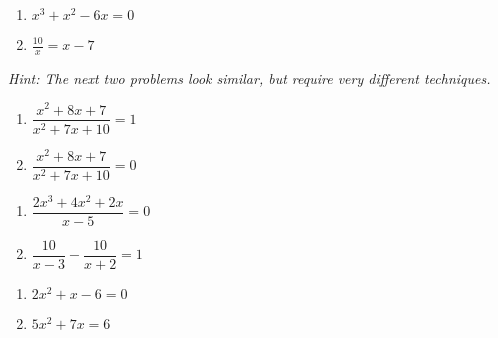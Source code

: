 \documentclass[11pt]{article}
\newcommand{\ds}{\displaystyle}
\begin{document}
\newpage
\begin{multicols}{2}
\begin{enumerate}
\setcounter{enumi}{\theenumCount}
\item $x^3+x^2 - 6x = 0$ 
\item $\ds \frac{10}{x} = x-7$ 
\setcounter{enumCount}{\theenumi}
\end{enumerate}
\end{multicols}
\vfill

\noindent
\textit{Hint: The next two problems look similar, but require very different techniques.} 
\begin{multicols}{2}
\begin{enumerate}
\setcounter{enumi}{\theenumCount}
\item $\dfrac{x^2+8x+7}{x^2+7x+10} = 1$ 
\item $\dfrac{x^2+8x+7}{x^2+7x+10} = 0$ 
\setcounter{enumCount}{\theenumi}
\end{enumerate}
\end{multicols}
\vfill


\begin{multicols}{2}
\begin{enumerate}
\setcounter{enumi}{\theenumCount}
\item $\dfrac{2x^3 + 4x^2 + 2x}{x-5} = 0$
\item $\dfrac{10}{x-3} - \dfrac{10}{x+2} = 1$
\setcounter{enumCount}{\theenumi}
\end{enumerate}
\end{multicols}
\vfill

\begin{multicols}{2}
\begin{enumerate}
\setcounter{enumi}{\theenumCount}
\item $2x^2+x-6 = 0$
\item $5x^2 + 7x= 6$
\setcounter{enumCount}{\theenumi}
\end{enumerate}
\end{multicols}
\vfill
\end{document}
